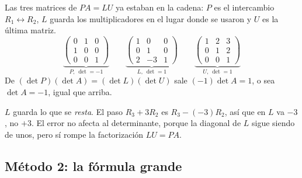 \documentclass[11pt,letterpaper]{article}
\begin{document}
Las tres matrices de $PA = LU$ ya estaban en la cadena: $P$ es el
intercambio $R_1 \leftrightarrow R_2$, $L$ guarda los multiplicadores
en el lugar donde se usaron y $U$ es la última matriz.
\[
    \underbrace{\begin{pmatrix} 0 & 1 & 0 \\ 1 & 0 & 0 \\ 0 & 0 & 1
    \end{pmatrix}}_{P,\ \det = -1}
    \qquad
    \underbrace{\begin{pmatrix} 1 & 0 & 0 \\ 0 & 1 & 0 \\ 2 & -3 & 1
    \end{pmatrix}}_{L,\ \det = 1}
    \qquad
    \underbrace{\begin{pmatrix} 1 & 2 & 3 \\ 0 & 1 & 2 \\ 0 & 0 & 1
    \end{pmatrix}}_{U,\ \det = 1}
\]
De $(\det P)(\det A) = (\det L)(\det U)$ sale $(-1)\det A = 1$, o sea
$\det A = -1$, igual que arriba.

\begin{ojo}
    $L$ guarda lo que se \emph{resta}. El paso $R_3 + 3R_2$ es
    $R_3 - (-3)R_2$, así que en $L$ va $-3$, no $+3$. El error no
    afecta al determinante, porque la diagonal de $L$ sigue siendo de
    unos, pero sí rompe la factorización $LU = PA$.
\end{ojo}


\subsection*{Método 2: la fórmula grande}
\end{document}
